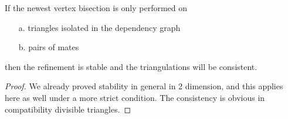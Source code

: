     \begin{lemma*}
    If the newest vertex bisection is only performed on 
    \begin{itemize}
        \item[a. ] triangles isolated in the dependency graph
        \item[b. ] pairs of mates
      \end{itemize}
    then the refinement is stable and the triangulations will be consistent.
    \end{lemma*}
    \begin{proof}
    We already proved stability in general in 2 dimension, and this applies here as well under a more strict condition. The consistency is obvious in compatibility divisible triangles.
    \end{proof}
